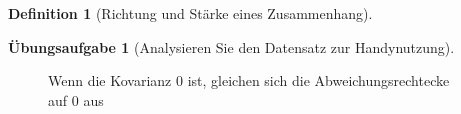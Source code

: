 \documentclass[
  a4paper,
  DIV=11]{scrreprt}
\theoremstyle{definition}
\newtheorem{exercise}{Übungsaufgabe}[chapter]
\theoremstyle{definition}
\theoremstyle{definition}
\newtheorem{definition}{Definition}[chapter]
\theoremstyle{remark}
\begin{document}
\begin{definition}[Richtung und Stärke eines
Zusammenhang]
\begin{exercise}[Analysieren Sie den Datensatz zur
Handynutzung]
\begin{figure}

\begin{minipage}{0.50\linewidth}



\end{minipage}%
%
\begin{minipage}{0.50\linewidth}



\end{minipage}%

\caption{\label{fig-covnull}Wenn die Kovarianz 0 ist, gleichen sich die
Abweichungsrechtecke auf 0 aus}


\end{figure}
\end{exercise}
\end{definition}
\end{document}
